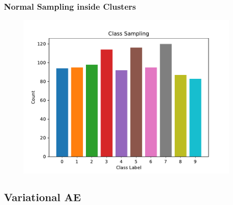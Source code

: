 \documentclass[10pt, usenames, dvipsnames, table]{beamer}
\begin{document}
\begin{frame}
  \frametitle{Normal Sampling inside Clusters}
  \begin{figure}
    \centering
    \includegraphics[width=\linewidth]
    {models/mnist_conv_e300_L2_b64/multi-normal-cluster_sampling_distribution_1000}
    \caption{}
    \label{}
  \end{figure}
\end{frame}

\subsection{Variational AE}

\end{document}
